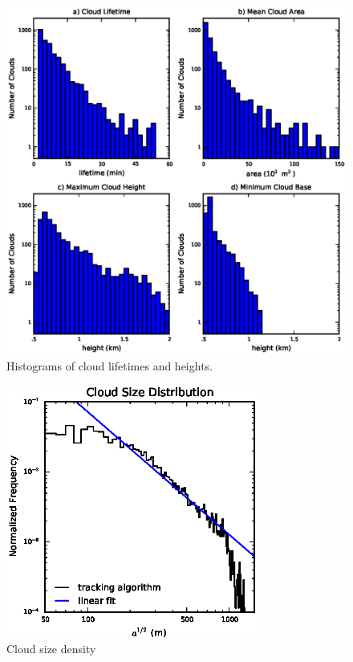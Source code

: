 \documentclass[acp]{copernicus}
\begin{document}
\begin{figure}[t]
\vspace*{2mm}
\begin{center}
\includegraphics[width=\textwidth]{./figures/cloud_stats}
\end{center}
\caption{Histograms of cloud lifetimes and heights.}
\label{fig:cloud_stats}
\end{figure}

\begin{figure}[t]
\vspace*{2mm}
\begin{center}
\includegraphics[width=8.3cm]{./figures/cloud_areas}
\end{center}
\caption{Cloud size density}
\label{fig:cloud_areas}
\end{figure}
\end{document}
